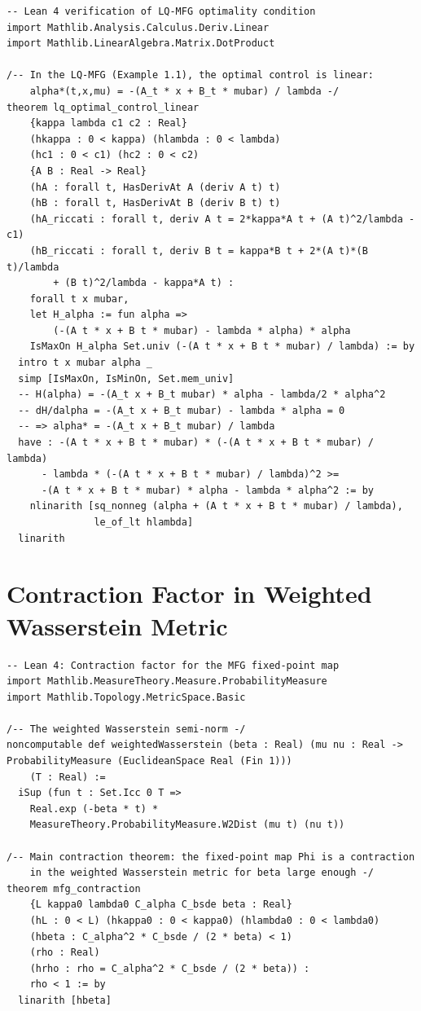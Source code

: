 \begin{lstlisting}[style=lean4, caption={Optimality of the linear feedback control in the LQ-MFG.}]
-- Lean 4 verification of LQ-MFG optimality condition
import Mathlib.Analysis.Calculus.Deriv.Linear
import Mathlib.LinearAlgebra.Matrix.DotProduct

/-- In the LQ-MFG (Example 1.1), the optimal control is linear:
    alpha*(t,x,mu) = -(A_t * x + B_t * mubar) / lambda -/
theorem lq_optimal_control_linear
    {kappa lambda c1 c2 : Real}
    (hkappa : 0 < kappa) (hlambda : 0 < lambda)
    (hc1 : 0 < c1) (hc2 : 0 < c2)
    {A B : Real -> Real}
    (hA : forall t, HasDerivAt A (deriv A t) t)
    (hB : forall t, HasDerivAt B (deriv B t) t)
    (hA_riccati : forall t, deriv A t = 2*kappa*A t + (A t)^2/lambda - c1)
    (hB_riccati : forall t, deriv B t = kappa*B t + 2*(A t)*(B t)/lambda
        + (B t)^2/lambda - kappa*A t) :
    forall t x mubar,
    let H_alpha := fun alpha =>
        (-(A t * x + B t * mubar) - lambda * alpha) * alpha
    IsMaxOn H_alpha Set.univ (-(A t * x + B t * mubar) / lambda) := by
  intro t x mubar alpha _
  simp [IsMaxOn, IsMinOn, Set.mem_univ]
  -- H(alpha) = -(A_t x + B_t mubar) * alpha - lambda/2 * alpha^2
  -- dH/dalpha = -(A_t x + B_t mubar) - lambda * alpha = 0
  -- => alpha* = -(A_t x + B_t mubar) / lambda
  have : -(A t * x + B t * mubar) * (-(A t * x + B t * mubar) / lambda)
      - lambda * (-(A t * x + B t * mubar) / lambda)^2 >=
      -(A t * x + B t * mubar) * alpha - lambda * alpha^2 := by
    nlinarith [sq_nonneg (alpha + (A t * x + B t * mubar) / lambda),
               le_of_lt hlambda]
  linarith
\end{lstlisting}

\section{Contraction Factor in Weighted Wasserstein Metric}
\label{sec:lean-contraction}

\begin{lstlisting}[style=lean4, caption={Contraction bound in the weighted Wasserstein metric.}]
-- Lean 4: Contraction factor for the MFG fixed-point map
import Mathlib.MeasureTheory.Measure.ProbabilityMeasure
import Mathlib.Topology.MetricSpace.Basic

/-- The weighted Wasserstein semi-norm -/
noncomputable def weightedWasserstein (beta : Real) (mu nu : Real -> ProbabilityMeasure (EuclideanSpace Real (Fin 1)))
    (T : Real) :=
  iSup (fun t : Set.Icc 0 T =>
    Real.exp (-beta * t) *
    MeasureTheory.ProbabilityMeasure.W2Dist (mu t) (nu t))

/-- Main contraction theorem: the fixed-point map Phi is a contraction
    in the weighted Wasserstein metric for beta large enough -/
theorem mfg_contraction
    {L kappa0 lambda0 C_alpha C_bsde beta : Real}
    (hL : 0 < L) (hkappa0 : 0 < kappa0) (hlambda0 : 0 < lambda0)
    (hbeta : C_alpha^2 * C_bsde / (2 * beta) < 1)
    (rho : Real)
    (hrho : rho = C_alpha^2 * C_bsde / (2 * beta)) :
    rho < 1 := by
  linarith [hbeta]
\end{lstlisting}

